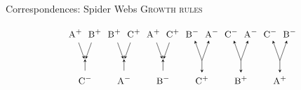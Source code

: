 \documentclass{beamer}
\newcommand\tsc[1]{\alert{\textsc{#1}}}
\begin{document}
	\begin{frame}{Correspondences: Spider Webs}
		\center \tsc{Growth rules}
		\vspace{-.6cm}
		\begin{figure}[h!]
			\[
			\begin{tikzpicture}[
			scale=.7,
			every node/.style={anchor=base},xscale=1,yscale=1.2,
			-->/.style={->,shorten >=2pt,shorten <=2pt,>=stealth},
			<--/.style={<-,shorten >=2pt,shorten <=2pt,>=stealth},
			--->/.style={->,shorten >=1pt,shorten <=1pt,>=stealth},
			<---/.style={<-,>=stealth},
			]
			\node (i1) at (0,0) {$\textsc{\small A}^+$};
			\node (ii1) at (1,0) {$\textsc{\small B}^+$};
			\node (d1) at (.5,-1) {};
			\node (o1) at (.5,-2) {$\textsc{\small C}^-$};
			\draw[-->] (i1) -- (d1.center);
			\draw[-->] (ii1) -- (d1.center);
			\draw[<--] (d1.north) -- (o1);
			
			\node (i2) at (2,0) {$\textsc{\small B}^+$};
			\node (ii2) at (3,0) {$\textsc{\small C}^+$};
			\node (d2) at (2.5,-1) {};
			\node (o2) at (2.5,-2) {$\textsc{\small A}^-$};
			\draw[-->] (i2) -- (d2.center);
			\draw[-->] (ii2) -- (d2.center);
			\draw[<--] (d2.north) -- (o2);
			
			\node (i3) at (4,0) {$\textsc{\small A}^+$};
			\node (ii3) at (5,0) {$\textsc{\small C}^+$};
			\node (d3) at (4.5,-1) {};
			\node (o3) at (4.5,-2) {$\textsc{\small B}^-$};
			\draw[-->] (i3) -- (d3.center);
			\draw[-->] (ii3) -- (d3.center);
			\draw[<--] (d3.north) -- (o3);
			
			\node (i4) at (6,0) {$\textsc{\small B}^-$};
			\node (ii4) at (7,0) {$\textsc{\small A}^-$};
			\node (d4) at (6.5,-1) {};
			\node (o4) at (6.5,-2) {$\textsc{\small C}^+$};
			\draw[<-,>=stealth] (i4) -- (d4.center);
			\draw[<-,>=stealth] (ii4) -- (d4.center);
			\draw[->,>=stealth] (d4.center) -- (o4);
			
			\node (i5) at (8,0) {$\textsc{\small C}^-$};
			\node (ii5) at (9,0) {$\textsc{\small A}^-$};
			\node (d5) at (8.5,-1) {};
			\node (o5) at (8.5,-2) {$\textsc{\small B}^+$};
			\draw[<-,>=stealth] (i5) -- (d5.center);
			\draw[<-,>=stealth] (ii5) -- (d5.center);
			\draw[->,>=stealth] (d5.center) -- (o5);
			
			\node (i6) at (10,0) {$\textsc{\small C}^-$};
			\node (ii6) at (11,0) {$\textsc{\small B}^-$};
			\node (d6) at (10.5,-1) {};
			\node (o6) at (10.5,-2) {$\textsc{\small A}^+$};
			\draw[<-,>=stealth] (i6) -- (d6.center);
			\draw[<-,>=stealth] (ii6) -- (d6.center);
			\draw[->,>=stealth] (d6.center) -- (o6);
			

\end{tikzpicture}\]
\end{figure}
\end{frame}
\end{document}

